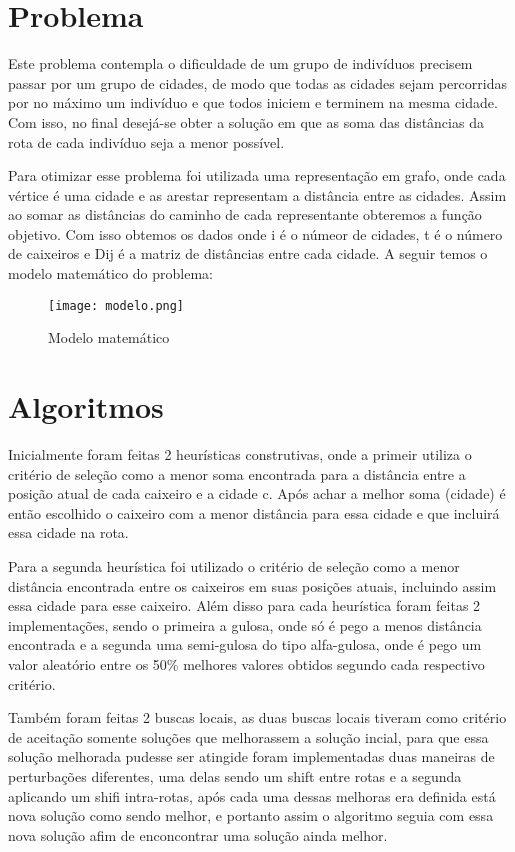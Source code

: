 \documentclass[12pt]{article}
\begin{document}
\section{Problema} \label{sec:firstpage}

Este problema contempla o dificuldade de um grupo de indivíduos precisem passar por um grupo de cidades, de modo que todas as cidades sejam percorridas por no máximo um indivíduo e que todos iniciem e terminem na mesma cidade. Com isso, no final desejá-se obter a solução em que as soma das distâncias da rota de cada indivíduo seja a menor possível.

Para otimizar esse problema foi utilizada uma representação em grafo, onde cada vértice é uma cidade e as arestar representam a distância entre as cidades. Assim ao somar as distâncias do caminho de cada representante obteremos a função objetivo. Com isso obtemos os dados onde i é o númeor de cidades, t é o número de caixeiros e Dij é a matriz de distâncias entre cada cidade. A seguir temos o modelo matemático do problema:

\begin{figure}[ht]
\centering
\texttt{[image: modelo.png]}
\caption{Modelo matemático}
\label{fig:heuristica}
\end{figure}

\section{Algoritmos}

Inicialmente foram feitas 2 heurísticas construtivas, onde a primeir utiliza o critério de seleção como a menor soma encontrada para a distância entre a posição atual de cada caixeiro e a cidade c. Após achar a melhor soma (cidade) é então escolhido o caixeiro com a menor distância para essa cidade e que incluirá essa cidade na rota.

Para a segunda heurística foi utilizado o critério de seleção como a menor distância encontrada entre os caixeiros em suas posições atuais, incluindo assim essa cidade para esse caixeiro. Além disso para cada heurística foram feitas 2 implementações, sendo o primeira a gulosa, onde só é pego a menos distância encontrada e a segunda uma semi-gulosa do tipo alfa-gulosa, onde é pego um valor aleatório entre os 50\% melhores valores obtidos segundo cada respectivo critério.

Também foram feitas 2 buscas locais, as duas buscas locais tiveram como critério de aceitação somente soluções que melhorassem a solução incial, para que essa solução melhorada pudesse ser atingide foram implementadas duas maneiras de perturbações diferentes, uma delas sendo um shift entre rotas e a segunda aplicando um shifi intra-rotas, após cada uma dessas melhoras era definida está nova solução como sendo melhor, e portanto assim o algoritmo seguia com essa nova solução afim de enconcontrar uma solução ainda melhor.
\end{document}
